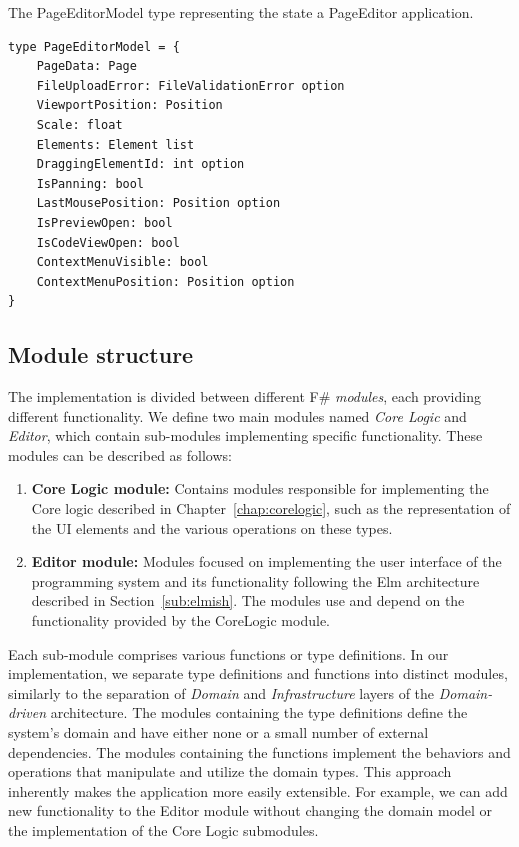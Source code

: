 \begin{listing}[htbp]
	\caption{The PageEditorModel type representing the state a PageEditor application.}
	\label{fig:editorModel}
	\begin{lstlisting}
type PageEditorModel = {
    PageData: Page
    FileUploadError: FileValidationError option
    ViewportPosition: Position
    Scale: float
    Elements: Element list
    DraggingElementId: int option
    IsPanning: bool
    LastMousePosition: Position option
    IsPreviewOpen: bool
    IsCodeViewOpen: bool
    ContextMenuVisible: bool
    ContextMenuPosition: Position option
}
  \end{lstlisting}
\end{listing}
\medskip
\subsection{Module structure}
\nopagebreak[4]
The implementation is divided between different F\# \emph{modules}, each providing different functionality.
We define two main modules named \emph{Core Logic} and \emph{Editor}, which contain sub-modules implementing specific functionality.
These modules can be described as follows:
\begin{enumerate}
	\item \textbf{Core Logic module:} Contains modules responsible for implementing the Core logic described in Chapter~\ref{chap:corelogic}, such as the representation of the UI elements and the various operations on these types.
	\item \textbf{Editor module:} Modules focused on implementing the user interface of the programming system and its functionality following the Elm architecture described in Section~\ref{sub:elmish}.
	      The modules use and depend on the functionality provided by the CoreLogic module.
\end{enumerate}

Each sub-module comprises various functions or type definitions.
In our implementation, we separate type definitions and functions into distinct modules, similarly to the separation of \emph{Domain} and \emph{Infrastructure} layers of the \emph{Domain-driven} architecture.
The modules containing the type definitions define the system's domain and have either none or a small number of external dependencies.
The modules containing the functions implement the behaviors and operations that manipulate and utilize the domain types.
This approach inherently makes the application more easily extensible.
For example, we can add new functionality to the Editor module without changing the domain model or the implementation of the Core Logic submodules.
\medskip
